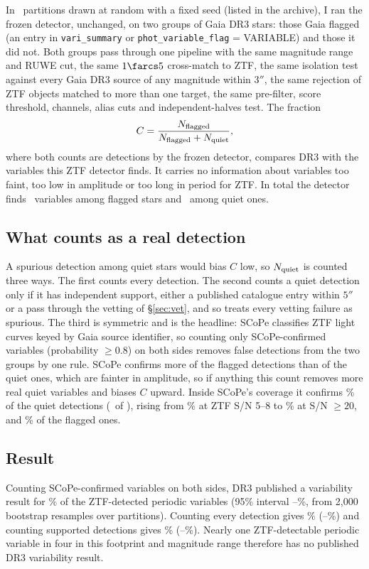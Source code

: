 \documentclass[twocolumn]{searchchev_preprint}
\begin{document}
In \nbNtiles\ partitions drawn at random with a fixed seed (listed in the archive), I ran the frozen detector,
unchanged, on two groups of Gaia DR3 stars: those Gaia flagged (an entry in \texttt{vari\_summary} or
\texttt{phot\_variable\_flag} = VARIABLE) and those it did not. Both groups pass through one pipeline with the same
magnitude range and RUWE cut, the same $1\farcs5$ cross-match to ZTF, the same isolation test against every Gaia DR3
source of any magnitude within $3''$, the same rejection of ZTF objects matched to more than one target, the same
pre-filter, score threshold, channels, alias cuts and independent-halves test. The fraction
\begin{equation}
C = \frac{N_{\rm flagged}}{N_{\rm flagged}+N_{\rm quiet}},
\end{equation}
where both counts are detections by the frozen detector, compares DR3 with the variables this ZTF detector finds. It
carries no information about variables too faint, too low in amplitude or too long in period for ZTF.
In total the detector finds \nbNF\ variables among flagged stars and \nbNQ\ among quiet ones.

\subsection{What counts as a real detection}
A spurious detection among quiet stars would bias $C$ low, so $N_{\rm quiet}$ is counted three ways. The first counts
every detection. The second counts a quiet detection only if it has independent support, either a published
catalogue entry within $5''$ or a pass through the vetting of \S\ref{sec:vet}, and so treats every vetting failure
as spurious. The third is symmetric and is the headline: SCoPe \citep{Healy2024} classifies ZTF light curves keyed by
Gaia source identifier, so counting only SCoPe-confirmed variables (probability $\ge0.8$) on both sides removes false
detections from the two groups by one rule. SCoPe confirms more of the flagged detections than of the quiet ones,
which are fainter in amplitude, so if anything this count removes more real quiet variables and biases $C$ upward. Inside SCoPe's coverage it confirms \nbpurQ\% of the quiet detections
(\nbNQsc\ of \nbNQin), rising from \nbpurQlow\% at ZTF S/N 5--8 to \nbpurQhigh\% at S/N $\ge20$, and \nbpurF\% of the
flagged ones.

\subsection{Result}
Counting SCoPe-confirmed variables on both sides, DR3 published a variability result for \nbCsc\% of the ZTF-detected
periodic variables (95\% interval \nbCsclo--\nbCschi\%, from 2{,}000 bootstrap resamples over partitions). Counting
every detection gives \nbCall\% (\nbCalllo--\nbCallhi\%) and counting supported detections gives \nbCsup\%
(\nbCsuplo--\nbCsuphi\%). Nearly one ZTF-detectable periodic variable in four in this footprint and magnitude range therefore
has no published DR3 variability result.
\end{document}
